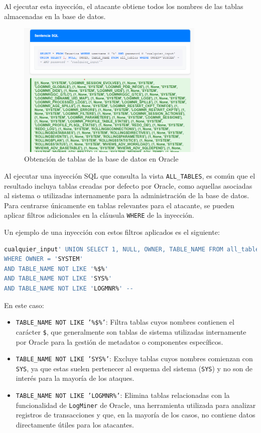 \documentclass[a4paper,12pt]{article}
\begin{document}
Al ejecutar esta inyección, el atacante obtiene todos los nombres de las tablas almacenadas en la base de datos.

\begin{figure}[H]
    \centering
    \includegraphics[width=0.8\textwidth]{Imagenes/union5.png}
    \caption{Obtención de tablas de la base de datos en Oracle}
\end{figure}

Al ejecutar una inyección SQL que consulta la vista \texttt{ALL\_TABLES}, es común que el resultado incluya tablas creadas por defecto por Oracle, como aquellas asociadas al sistema o utilizadas internamente para la administración de la base de datos. Para centrarse únicamente en tablas relevantes para el atacante, se pueden aplicar filtros adicionales en la cláusula \texttt{WHERE} de la inyección.

Un ejemplo de una inyección con estos filtros aplicados es el siguiente:

\begin{lstlisting}[language=SQL]
cualquier_input' UNION SELECT 1, NULL, OWNER, TABLE_NAME FROM all_tables 
WHERE OWNER = 'SYSTEM' 
AND TABLE_NAME NOT LIKE '%$%' 
AND TABLE_NAME NOT LIKE 'SYS%' 
AND TABLE_NAME NOT LIKE 'LOGMNR%' --
\end{lstlisting}

En este caso:
\begin{itemize}
    \item \texttt{TABLE\_NAME NOT LIKE '\%\$\%'}: Filtra tablas cuyos nombres contienen el carácter \texttt{\$}, que generalmente son tablas de sistema utilizadas internamente por Oracle para la gestión de metadatos o componentes específicos.
    \item \texttt{TABLE\_NAME NOT LIKE 'SYS\%'}: Excluye tablas cuyos nombres comienzan con \texttt{SYS}, ya que estas suelen pertenecer al esquema del sistema (\texttt{SYS}) y no son de interés para la mayoría de los ataques.
    \item \texttt{TABLE\_NAME NOT LIKE 'LOGMNR\%'}: Elimina tablas relacionadas con la funcionalidad de \texttt{LogMiner} de Oracle, una herramienta utilizada para analizar registros de transacciones y que, en la mayoría de los casos, no contiene datos directamente útiles para los atacantes.
\end{itemize}
\end{document}

